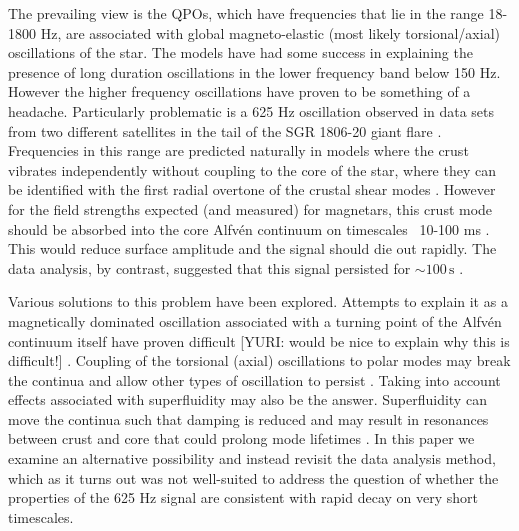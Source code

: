 \documentclass{emulateapj}
\begin{document}
The prevailing view is the QPOs, which have frequencies that lie in the range 18-1800 Hz, are associated with global magneto-elastic (most likely torsional/axial) oscillations of the star. The models have had some success in explaining the presence of long duration oscillations in the lower frequency band below 150 Hz. However the higher frequency oscillations have proven to be something of a headache. Particularly problematic is a 625 Hz oscillation observed in data sets from two different satellites in the tail of the SGR 1806-20 giant flare \citep{Watts06, Strohmayer06}.  Frequencies in this range are predicted naturally in models where the crust vibrates independently without coupling to the core of the star, where they can be identified with the first radial overtone of the crustal shear modes \citep{Piro05}.  However for the field strengths expected (and measured) for magnetars, this crust mode should be absorbed into the core Alfv\'en continuum on timescales ~10-100 ms \citep{vanHoven12, Gabler12}. This would reduce surface amplitude and the signal should die out rapidly. The data analysis, by contrast, suggested that this signal persisted for $\sim100 \, \mathrm{s}$ \citep{Strohmayer06}.

Various solutions to this problem have been explored. Attempts to explain it as a magnetically dominated oscillation associated with a turning point of the Alfv\'en continuum itself have proven difficult [YURI: would be nice to explain why this is difficult!] \citep{vanHoven11, vanHoven12}. Coupling of the torsional (axial) oscillations to polar modes may break the continua and allow other types of oscillation to persist \citep{Lander10, Lander11, Colaiuda12}. Taking into account effects associated with superfluidity may also be the answer. Superfluidity can move the continua such that damping is reduced \citep{vanHoven08, Andersson09, Passamonti13a} and may result in resonances between crust and core that could prolong mode lifetimes \citep{Gabler13, Passamonti13b}.  In this paper we examine an alternative possibility and instead revisit the data analysis method, which as it turns out was not well-suited to address the question of whether the properties of the 625 Hz signal are consistent with rapid decay on very short timescales.
\end{document}
